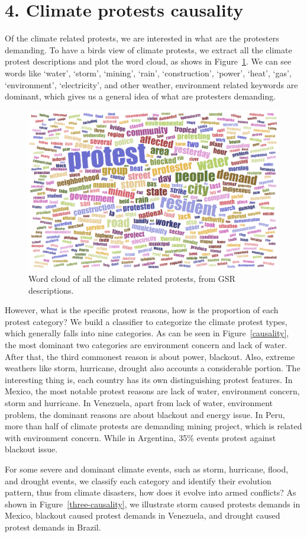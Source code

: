 \documentclass[9pt,twocolumn,twoside]{pnas-new}
\begin{document}
\section*{4. Climate protests causality}
Of the climate related protests, we are interested in what are the protesters demanding. To have a birds view of climate protests, we extract all the climate protest descriptions and plot the word cloud, as shows in Figure~\ref{wordcloud}. We can see words like `water', `storm', `mining', `rain', `construction', `power', `heat', `gas', `environment', `electricity', and other weather, environment related keywords are dominant, which gives us a general idea of what are protesters demanding.

\begin{figure}[ht]
\centerline
{\includegraphics[width=.35\textwidth]{figures/Climate_word_cloud}}
\caption{Word cloud of all the climate related protests, from GSR descriptions.}
\label{wordcloud}
\end{figure}

However, what is the specific protest reasons, how is the proportion of each protest category? We build a classifier to categorize the climate protest types, which generally falls into nine categories. As can be seen in Figure~\ref{causality}, the most dominant two categories are environment concern and lack of water. After that, the third commonest reason is about power, blackout. Also, extreme weathers like storm, hurricane, drought also accounts a considerable portion. The interesting thing is, each country has its own distinguishing protest features. In Mexico, the most notable protest reasons are lack of water, environment concern, storm and hurricane. In Venezuela, apart from lack of water, environment problem, the dominant reasons are about blackout and energy issue. In Peru, more than half of climate protests are demanding mining project, which is related with environment concern. While in Argentina, 35\% events protest against blackout issue.

For some severe and dominant climate events, such as storm, hurricane, flood, and drought events, we classify each category and identify their evolution pattern, thus from climate disasters, how does it evolve into armed conflicts? As shown in Figure~\ref{three-causality}, we illustrate storm caused protests demands in Mexico, blackout caused protest demands in Venezuela, and drought caused protest demands in Brazil.
\end{document}
